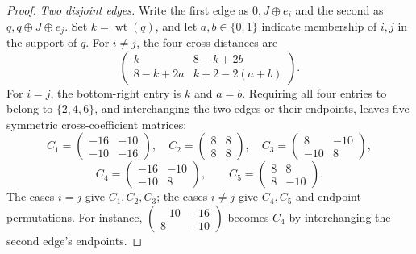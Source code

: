 \begin{proof}
\smallskip\noindent\emph{Two disjoint edges.}
Write the first edge as $0,J\oplus e_i$ and the second as
$q,q\oplus J\oplus e_j$. Set $k=\operatorname{wt}(q)$, and let
$a,b\in\{0,1\}$ indicate membership of $i,j$ in the support of $q$.
For $i\ne j$, the four cross distances are
\[
\begin{pmatrix}k&8-k+2b\\8-k+2a&k+2-2(a+b)\end{pmatrix}.
\]
For $i=j$, the bottom-right entry is $k$ and $a=b$. Requiring all four
entries to belong to $\{2,4,6\}$, and interchanging the two edges or
their endpoints, leaves five symmetric cross-coefficient matrices:
\[
C_1=\begin{pmatrix}-16&-10\\-10&-16\end{pmatrix},\quad
C_2=\begin{pmatrix}8&8\\8&8\end{pmatrix},\quad
C_3=\begin{pmatrix}8&-10\\-10&8\end{pmatrix},
\]
\[
C_4=\begin{pmatrix}-16&-10\\-10&8\end{pmatrix},\qquad
C_5=\begin{pmatrix}8&8\\8&-10\end{pmatrix}.
\]
The cases $i=j$ give $C_1,C_2,C_3$; the cases $i\ne j$ give $C_4,C_5$
and endpoint permutations. For instance,
$\left(\begin{smallmatrix}-10&-16\\8&-10\end{smallmatrix}\right)$
becomes $C_4$ by interchanging the second edge's endpoints.


\end{proof}
